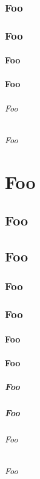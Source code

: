 \section{Foo}
\section{Foo}
\subsection{Foo}
\subsection{Foo}
\paragraph{Foo}
\paragraph{Foo}

\part{Foo}
\chapter{Foo}
\chapter{Foo}
\section{Foo}
\section{Foo}
\subsection{Foo}
\subsection{Foo}
\subsubsection{Foo}
\subsubsection{Foo}
\paragraph{Foo}
\paragraph{Foo}